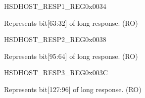 \begin{register}{H}{SDHOST\_RESP1\_REG}{0x0034}\label{regdesc:SDHOSTRESP1REG}
%
\regnewline%
\begin{regdesc}\begin{reglist}
\label{fielddesc:SDHOSTRESPONSE1REG}\item [SDHOST\_RESPONSE1\_REG] Represents bit[63:32] of long response. (RO)
\end{reglist}\end{regdesc}
\end{register}


\begin{register}{H}{SDHOST\_RESP2\_REG}{0x0038}\label{regdesc:SDHOSTRESP2REG}
%
\regnewline%
\begin{regdesc}\begin{reglist}
\label{fielddesc:SDHOSTRESPONSE2REG}\item [SDHOST\_RESPONSE2\_REG] Represents bit[95:64] of long response. (RO)
\end{reglist}\end{regdesc}
\end{register}


\begin{register}{H}{SDHOST\_RESP3\_REG}{0x003C}\label{regdesc:SDHOSTRESP3REG}
%
\regnewline%
\begin{regdesc}\begin{reglist}
\label{fielddesc:SDHOSTRESPONSE3REG}\item [SDHOST\_RESPONSE3\_REG] Represents bit[127:96] of long response. (RO)
\end{reglist}\end{regdesc}
\end{register}


